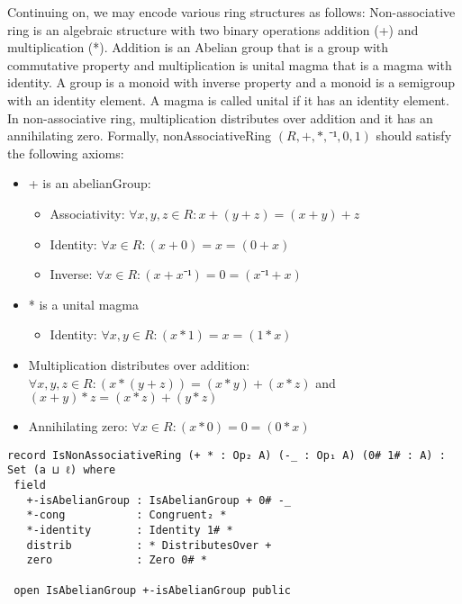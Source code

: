 Continuing on, we may encode various ring structures as follows: Non-associative
ring is an algebraic structure with two binary operations addition (+) and
multiplication (*). Addition is an Abelian group that is a group with
commutative property and multiplication is unital magma that is a magma with
identity. A group is a monoid with inverse property and a monoid is a semigroup
with an identity element. A magma is called unital if it has an identity
element. In non-associative ring, multiplication distributes over addition and
it has an annihilating zero. Formally, nonAssociativeRing $(R,+,*,⁻¹,0,1)$
should satisfy the following axioms:
\begin{itemize}
  \item + is an abelianGroup:
   \begin{itemize}
    \item Associativity: $\forall x,y,z \in R: x + (y + z) = (x + y) + z$
    \item Identity: $\forall x \in R: (x + 0) = x = (0 + x)$
    \item Inverse: $\forall x \in R: (x + x⁻¹) = 0 = (x⁻¹ + x)$
  \end{itemize}
  \item * is a unital magma
  \begin{itemize}
    \item Identity: $\forall x,y \in R: (x * 1) = x = (1 * x)$
  \end{itemize}
  \item Multiplication distributes over addition: \(\forall x , y , z \in R: (x * (y + z)) = (x * y) + (x
  * z)\) and \( (x + y) * z = (x * z) + (y * z) \)
  \item Annihilating zero: \(\forall x \in R: (x * 0) = 0 = (0 * x)\)
\end{itemize}
\begin{verbatim}
record IsNonAssociativeRing (+ * : Op₂ A) (-_ : Op₁ A) (0# 1# : A) : Set (a ⊔ ℓ) where
 field
   +-isAbelianGroup : IsAbelianGroup + 0# -_
   *-cong           : Congruent₂ *
   *-identity       : Identity 1# *
   distrib          : * DistributesOver +
   zero             : Zero 0# *

 open IsAbelianGroup +-isAbelianGroup public
\end{verbatim}

